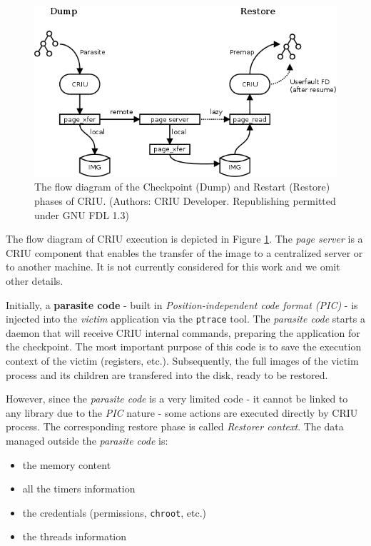 \begin{figure}[t]
    \centerline 
{\includegraphics[scale=0.4]{img/cap3-criumemoryflow.png}}
    \caption[CRIU: Checkpoint/Restart flow diagram]{The flow diagram of the Checkpoint (Dump) and Restart (Restore)
    phases of CRIU. (Authors: CRIU Developer.
    Republishing permitted under GNU FDL 1.3) }
    \label{fig:cap3-criuexec}
\end{figure}

The flow diagram of CRIU execution is depicted in Figure
\ref{fig:cap3-criuexec}. The \emph{page server} is a CRIU component
that enables the transfer of the image to a centralized server or
to another machine. It is not currently considered for this work and we omit
other details.

Initially, a \textbf{parasite code} - built in \emph{Position-independent code
format (PIC)} - is injected into the \emph{victim} application via the
\texttt{ptrace} tool.
The \emph{parasite code} starts a daemon that will receive CRIU 
internal commands,
preparing the application for the checkpoint. The most important purpose of
this code is to save the execution context of the victim (registers,  etc.).
Subsequently, the full images of the victim process and its children are
transfered into the disk, ready to be restored. 

However, since the \emph{parasite code} is a very limited code - it cannot be
linked to any library due to the \emph{PIC} nature - some actions are executed
directly by CRIU process. The corresponding restore phase is called
\emph{Restorer context}. The data managed outside the \emph{parasite code} is:
\begin{itemize}
\item the memory content
\item all the timers information
\item the credentials (permissions, \texttt{chroot}, etc.)
\item the threads information
\end{itemize}

